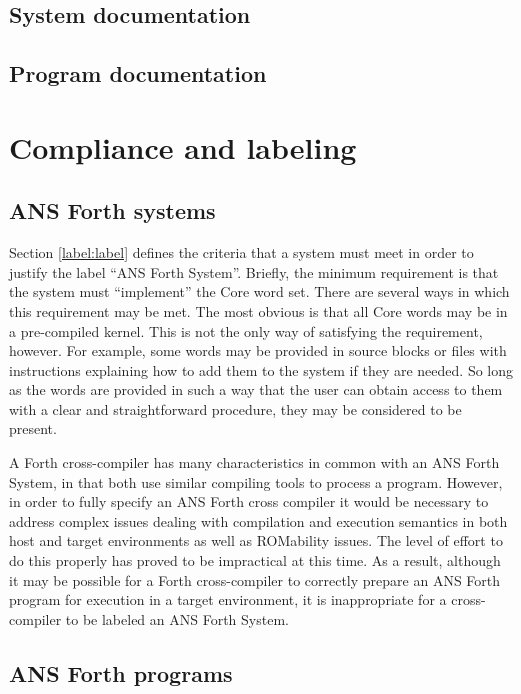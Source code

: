 \subsection{System documentation} %

\subsection{Program documentation} %

\section{Compliance and labeling} %

\subsection{ANS Forth systems} %

Section \ref{label:label} defines the criteria that a system must
meet in order to justify the label ``ANS Forth System''. Briefly,
the minimum requirement is that the system must ``implement'' the
Core word set. There are several ways in which this requirement may
be met. The most obvious is that all Core words may be in a pre-compiled
kernel. This is not the only way of satisfying the requirement,
however. For example, some words may be provided in source blocks or
files with instructions explaining how to add them to the system if
they are needed. So long as the words are provided in such a way that
the user can obtain access to them with a clear and straightforward
procedure, they may be considered to be present.

A Forth cross-compiler has many characteristics in common with an ANS
Forth System, in that both use similar compiling tools to process a
program. However, in order to fully specify an ANS Forth cross compiler
it would be necessary to address complex issues dealing with compilation
and execution semantics in both host and target environments as well as
ROMability issues. The level of effort to do this properly has proved to
be impractical at this time. As a result, although it may be possible
for a Forth cross-compiler to correctly prepare an ANS Forth program
for execution in a target environment, it is inappropriate for a
cross-compiler to be labeled an ANS Forth System.

\subsection{ANS Forth programs} %

